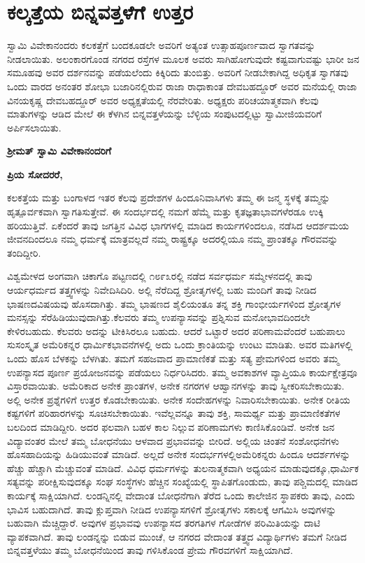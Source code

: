 
\chapter{ಕಲ್ಕತ್ತೆಯ ಬಿನ್ನವತ್ತಳೆಗೆ ಉತ್ತರ}

ಸ್ವಾಮಿ ವಿವೇಕಾನಂದರು ಕಲಕತ್ತೆಗೆ ಬಂದಕೂಡಲೇ ಅವರಿಗೆ ಅತ್ಯಂತ ಉತ್ಸಾಹಪೂರ್ಣವಾದ ಸ್ವಾಗತವನ್ನು ನೀಡಲಾಯಿತು. ಅಲಂಕಾರಗೊಂಡ ನಗರದ ರಸ್ತೆಗಳ ಮೂಲಕ ಅವರು ಸಾಗಿಹೋಗುವುದೇ ಕಷ್ಟವಾಗುವಷ್ಟು ಭಾರೀ ಜನ ಸಮೂಹವು ಅವರ ದರ್ಶನವನ್ನು ಪಡೆಯಲೆಂದು ಕಿಕ್ಕಿರಿದು ತುಂಬಿತ್ತು. ಅವರಿಗೆ ನೀಡಬೇಕಾಗಿದ್ದ ಅಧಿಕೃತ ಸ್ವಾಗತವು ಒಂದು ವಾರದ ಅನಂತರ ಶೋಭಾ ಬಜಾರಿನಲ್ಲಿರುವ ರಾಜಾ ರಾಧಾಕಾಂತ ದೇವಬಹದ್ದೂರ್​ ಅವರ ಮನೆಯಲ್ಲಿ ರಾಜಾ ವಿನಯಕೃಷ್ಣ ದೇವಬಹದ್ದೂರ್​ ಅವರ ಅಧ್ಯಕ್ಷತೆಯಲ್ಲಿ ನೆರವೇರಿತು. ಅಧ್ಯಕ್ಷರು ಪರಿಚಯಾತ್ಮಕವಾಗಿ ಕೆಲವು ಮಾತುಗಳನ್ನು ಆಡಿದ ಮೇಲೆ ಈ ಕೆಳಗಿನ ಬಿನ್ನವತ್ತಳೆ\-ಯನ್ನು ಬೆಳ್ಳಿಯ ಸಂಪುಟದಲ್ಲಿಟ್ಟು ಸ್ವಾಮೀಜಿಯವರಿಗೆ ಅರ್ಪಿಸಲಾಯಿತು.

\vskip 5pt

\textbf{ಶ‍್ರೀಮತ್​ ಸ್ವಾಮಿ ವಿವೇಕಾನಂದರಿಗೆ}

\textbf{ಪ್ರಿಯ ಸೋದರರೆ,}

ಕಲಕತ್ತೆಯ ಮತ್ತು ಬಂಗಾಳದ ಇತರ ಕೆಲವು ಪ್ರದೇಶಗಳ ಹಿಂದೂನಿವಾಸಿಗಳು ತಮ್ಮ ಈ ಜನ್ಮ ಸ್ಥಳಕ್ಕೆ ತಮ್ಮನ್ನು ಹೃತ್ಪೂರ್ವಕವಾಗಿ ಸ್ವಾಗತಿಸುತ್ತೇವೆ. ಈ ಸಂದರ್ಭದಲ್ಲಿ ನಮಗೆ ಹೆಮ್ಮೆ ಮತ್ತು ಕೃತಜ್ಞತಾಭಾವಗಳೆರಡೂ ಉಕ್ಕಿ ಹರಿಯುತ್ತಿವೆ. ಏಕೆಂದರೆ ತಾವು ಜಗತ್ತಿನ ವಿವಿಧ ಭಾಗಗಳಲ್ಲಿ ಮಾಡಿದ ಕಾರ್ಯಗಳಿಂದಲೂ, ನಡೆಸಿದ ಆದರ್ಶಮಯ ಜೀವನದಿಂದಲೂ ನಮ್ಮ ಧರ್ಮಕ್ಕೆ ಮಾತ್ರವಲ್ಲದೆ ನಮ್ಮ ರಾಷ್ಟ್ರಕ್ಕೂ ಅದರಲ್ಲಿಯೂ ನಮ್ಮ ಪ್ರಾಂತಕ್ಕೂ ಗೌರವವನ್ನು ತಂದಿದ್ದೀರಿ.

ವಿಶ್ವಮೇಳದ ಅಂಗವಾಗಿ ಚಿಕಾಗೊ ಪಟ್ಟಣದಲ್ಲಿ ೧೮೯೩ರಲ್ಲಿ ನಡೆದ ಸರ್ವಧರ್ಮ ಸಮ್ಮೇಳನದಲ್ಲಿ ತಾವು ಆರ್ಯಧರ್ಮದ ತತ್ತ್ವಗಳನ್ನು ನಿವೇದಿಸಿದಿರಿ. ಅಲ್ಲಿ ನೆರೆದಿದ್ದ ಶ್ರೋತೃಗಳಲ್ಲಿ ಬಹು ಮಂದಿಗೆ ತಾವು ನೀಡಿದ ಭಾಷಣದ\break ವಿಷಯವು ಹೊಸದಾಗಿತ್ತು. ತಮ್ಮ ಭಾಷಣದ ಶೈಲಿಯಂತೂ ತನ್ನ ಶಕ್ತಿ ಗಾಂಭೀರ್ಯಗಳಿಂದ ಶ್ರೋತೃಗಳ ಮನಸ್ಸನ್ನು ಸೆರೆಹಿಡಿಯುವುದಾಗಿತ್ತು.\break ಕೆಲವರು ತಮ್ಮ ಉಪನ್ಯಾಸವನ್ನು ಪ್ರಶ್ನಿಸುವ ಮನೋಭಾವದಿಂದಲೇ ಕೇಳಿರಬಹುದು. ಕೆಲವರು ಅದನ್ನು ಟೀಕಿಸಿರಲೂ ಬಹುದು. ಆದರೆ ಒಟ್ಟಾರೆ ಅದರ ಪರಿಣಾಮವೆಂದರೆ ಬಹುಪಾಲು ಸುಸಂಸ್ಕೃತ ಅಮೆರಿಕನ್ನರ ಧಾರ್ಮಿಕ\break ಭಾವನೆಗಳಲ್ಲಿ ಅದು ಒಂದು ಕ್ರಾಂತಿಯನ್ನು ಉಂಟು ಮಾಡಿತು. ಅವರ ಮತಿಗಳಲ್ಲಿ ಒಂದು ಹೊಸ ಬೆಳಕನ್ನು ಬೆಳಗಿತು. ತಮಗೆ ಸಹಜವಾದ ಪ್ರಾಮಾಣಿಕತೆ ಮತ್ತು ಸತ್ಯ ಪ್ರೇಮಗಳಿಂದ ಅವರು ತಮ್ಮ ಉಪನ್ಯಾಸದ ಪೂರ್ಣ ಪ್ರಯೋಜನವನ್ನು ಪಡೆಯಲು ನಿರ್ಧರಿಸಿದರು. ತಮ್ಮ ಅವಕಾಶಗಳ ವ್ಯಾಪ್ತಿಯೂ ಕಾರ್ಯಕ್ಷೇತ್ರವೂ ವಿಸ್ತಾರವಾಯಿತು. ಅಮೆರಿಕಾದ ಅನೇಕ ಪ್ರಾಂತಗಳ, ಅನೇಕ ನಗರಗಳ ಆಹ್ವಾನಗಳನ್ನು ತಾವು ಸ್ವೀಕರಿಸಬೇಕಾಯಿತು. ಅಲ್ಲಿ ಅನೇಕ ಪ್ರಶ್ನೆಗಳಿಗೆ ಉತ್ತರ ಕೊಡಬೇಕಾಯಿತು. ಅನೇಕ ಸಂದೇಹಗಳನ್ನು ನಿವಾರಿಸಬೇಕಾಯಿತು. ಅನೇಕ ರೀತಿಯ ಕಷ್ಟಗಳಿಗೆ ಪರಿಹಾರಗಳನ್ನು ಸೂಚಿಸಬೇಕಾಯಿತು. ಇವೆಲ್ಲವನ್ನೂ ತಾವು ಶಕ್ತಿ, ಸಾಮರ್ಥ್ಯ ಮತ್ತು ಪ್ರಾಮಾಣಿಕತೆಗಳ ಬಲದಿಂದ ಮಾಡಿದ್ದೀರಿ. ಅದರ ಫಲವಾಗಿ ಬಹಳ ಕಾಲ ನಿಲ್ಲುವ ಪರಿಣಾಮಗಳು ಕಾಣಿಸಿಕೊಂಡಿವೆ. ಅನೇಕ ಜನ ವಿದ್ಯಾವಂತರ ಮೇಲೆ ತಮ್ಮ ಬೋಧನೆಯು ಆಳವಾದ ಪ್ರಭಾವವನ್ನು ಬೀರಿದೆ. ಅಲ್ಲಿಯ ಚಿಂತನೆ ಸಂಶೋಧನೆಗಳು ಹೊಸ\break ಹಾದಿಯನ್ನು ಹಿಡಿಯುವಂತೆ ಮಾಡಿದೆ. ಅಲ್ಲದೆ ಅನೇಕ ಸಂದರ್ಭಗಳಲ್ಲಿ\break ಅಮೆರಿಕನ್ನರು ಹಿಂದೂ ಆದರ್ಶಗಳನ್ನು ಹೆಚ್ಚು ಹೆಚ್ಚಾಗಿ ಮೆಚ್ಚುವಂತೆ ಮಾಡಿದೆ. ವಿವಿಧ ಧರ್ಮಗಳನ್ನು ತುಲನಾತ್ಮಕವಾಗಿ ಅಧ್ಯಯನ ಮಾಡುವುದಕ್ಕೂ,\break ಧಾರ್ಮಿಕ ಸತ್ಯವನ್ನು ಪರೀಕ್ಷಿಸುವುದಕ್ಕೂ ಸಂಘ ಸಂಸ್ಥೆಗಳು ಹೆಚ್ಚಿನ ಸಂಖ್ಯೆಯಲ್ಲಿ ಸ್ಥಾಪಿತಗೊಂಡುದು, ತಾವು ಪಶ್ಚಿಮದಲ್ಲಿ ಮಾಡಿದ ಕಾರ್ಯಕ್ಕೆ ಸಾಕ್ಷಿಯಾಗಿದೆ. ಲಂಡನ್ನಿನಲ್ಲಿ ವೇದಾಂತ ಬೋಧನೆಗಾಗಿ ತೆರೆದ ಒಂದು ಕಾಲೇಜಿನ ಸ್ಥಾಪಕರು ತಾವು, ಎಂದು ಭಾವಿಸ ಬಹುದಾಗಿದೆ. ತಾವು ಕ್ಲುಪ್ತವಾಗಿ ನೀಡಿದ ಉಪನ್ಯಾಸಗಳಿಗೆ ಶ್ರೋತೃಗಳು ಸಕಾಲಕ್ಕೆ ಆಗಮಿಸಿ ಅವುಗಳನ್ನು ಬಹುವಾಗಿ ಮೆಚ್ಚಿದ್ದಾರೆ. ಅವುಗಳ ಪ್ರಭಾವವು ಉಪನ್ಯಾಸದ ತರಗತಿಗಳ ಗೋಡೆಗಳ ಪರಿಮಿತಿಯನ್ನು ದಾಟಿ ವ್ಯಾಪಕವಾಗಿದೆ. ತಾವು ಲಂಡನ್ನನ್ನು ಬಿಡುವ ಮುಂಚೆ, ಆ ನಗರದ ವೇದಾಂತ ತತ್ತ್ವದ ವಿದ್ಯಾರ್ಥಿಗಳು ತಮಗೆ ನೀಡಿದ ಬಿನ್ನವತ್ತಳೆಯು ತಮ್ಮ ಬೋಧನೆಯಿಂದ ತಾವು ಗಳಿಸಿಕೊಂಡ ಪ್ರೇಮ ಗೌರವಗಳಿಗೆ ಸಾಕ್ಷಿಯಾಗಿದೆ.

